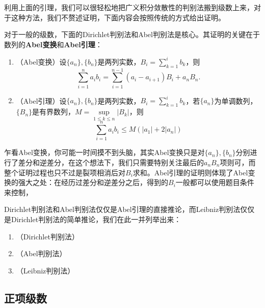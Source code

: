 利用上面的引理，我们可以很轻松地把广义积分敛散性的判别法搬到级数上来，对于这种方法，我们不赘述证明，下面内容会按照传统的方式给出证明。

对于一般的级数，下面的Dirichlet判别法和Abel判别法是核心。其证明的关键在于数列的\textbf{Abel变换}和\textbf{Abel引理}：
\begin{lemma}
    \begin{enumerate}
        \item （Abel变换）设\(\{a_n\},\{b_n\}\)是两列实数，\(B_i=\sum\limits_{k=1}^{i}b_k\)，则\[\sum_{i=1}^{n}a_ib_i=\sum_{i=1}^{n-1}(a_i-a_{i+1})B_i+a_nB_n.\]
        \item （Abel引理）设\(\{a_n\},\{b_n\}\)是两列实数，\(B_i=\sum\limits_{k=1}^{i}b_k\)，若\(\{a_n\}\)为单调数列，\(\{B_n\}\)是有界数列，\(M=\sup\limits_{1\leq k\leq n}\vert B_k\vert\)，则\[\sum_{i=1}^{n}a_ib_i\leq M(\vert a_1\vert+2\vert a_n\vert)\]
    \end{enumerate}
\end{lemma}

乍看Abel变换，你可能一时间摸不到头脑，其实Abel变换只是对\(\{a_n\},\{b_n\}\)分别进行了差分和逆差分，在这个想法下，我们只需要特别关注最后的\(a_nB_n\)项则可，而整个证明过程也只不过是裂项相消后对\(B_i\)求和。Abel引理的证明则体现了Abel变换的强大之处：在经历过差分和逆差分之后，得到的\(B_i\)一般都可以使用题目条件来控制，

Dirichlet判别法和Abel判别法仅仅是Abel引理的直接推论，而Leibniz判别法仅仅是Dirichlet判别法的简单推论，我们在此一并列举出来：

\begin{theorem}
    \begin{enumerate}
        \item （Dirichlet判别法）
        \item （Abel判别法）
        \item （Leibniz判别法）
    \end{enumerate}
\end{theorem}
\subsection{正项级数}
\begin{theorem}[基本判别法]
    
\end{theorem}
\begin{theorem}[比较判别法]
    
\end{theorem}
\begin{theorem}[积分判别法]
    
\end{theorem}
\begin{theorem}[Kummer判别法]
    
\end{theorem}


